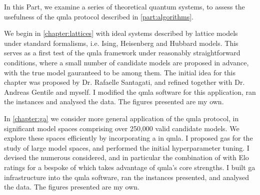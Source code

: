 In this Part, we examine a series of theoretical quantum systems, 
    to assess the usefulness of the \gls{qmla} protocol described in \cref{part:algorithms}. 
\par 
\vspace{1cm}

We begin in \cref{chapter:lattices} with ideal systems described by lattice models 
    under standard formalisms, i.e. Ising, Heisenberg and Hubbard models. 
This serves as a first test of the \gls{qmla} framework under reasonably straightforward
    conditions, where a small number of candidate models are proposed in advance, 
    with the \gls{true model} gauranteed to be among them. 
The initial idea for this chapter was proposed by Dr. Rafaelle Santagati, 
    and refined together with Dr. Andreas Gentile and myself. 
I modified the \gls{qmla} software for this application, 
    ran the \glspl{instance} and analysed the data. 
The figures presented are my own.

\par 
\vspace{1cm}
In \cref{chapter:ga} we consider more general application of the \gls{qmla} protocol, 
    in significant model spaces comprising over 250,000 valid candidate models. 
We explore these spaces efficiently by incorporating a  in \gls{qmla}. 
I proposed \glspl{ga} for the study of large model spaces, 
    and performed the initial \gls{hyperparameter} tuning. 
I devised the numerous  considered, 
    and in particular the combination of 
    with Elo ratings for a bespoke \gls{of} which takes advantage of \gls{qmla}'s core strengths. 
I built \gls{ga} infrastructure into the \gls{qmla} software, 
    ran the \glspl{instance} presented, and analysed the data.
The figures presented are my own. 
